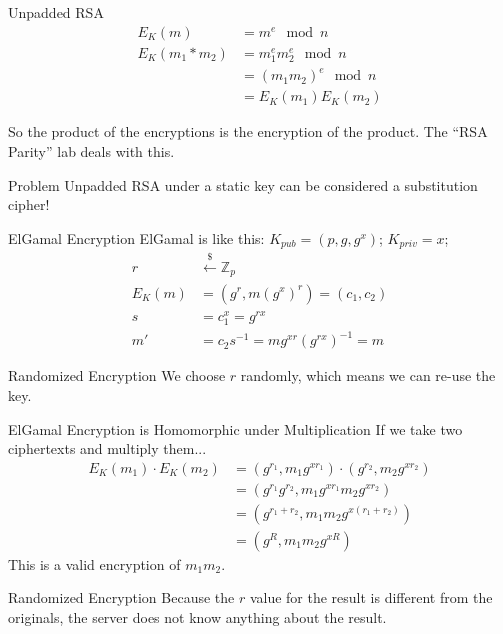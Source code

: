 \documentclass[12pt]{beamer}
\begin{document}
\begin{frame}{Unpadded RSA}
	\begin{align*}
		E_K(m) &= m^e \mod n \\
		E_K(m_1 * m_2) &= m_1^e m_2^e \mod n \\
		&= (m_1m_2)^e \mod n \\
		&= E_K(m_1) E_K(m_2)
	\end{align*}

	\begin{block}{}
		So the product of the encryptions is the encryption of the product. The
		``RSA Parity'' lab deals with this.
	\end{block}

	\begin{alertblock}{Problem}
		Unpadded RSA under a static key can be considered a substitution cipher!
	\end{alertblock}
\end{frame}

\begin{frame}{ElGamal Encryption}
	ElGamal is like this: $K_{pub} = (p, g, g^x)$; $K_{priv} = x$;
	\begin{align*}
		r &\xleftarrow{\$} \mathbb{Z}_p \\
		E_K(m) &= (g^r, m(g^x)^r) = (c_1, c_2) \\
		s &= c_1^x = g^{rx} \\
		m' &= c_2s^{-1} = mg^{xr} (g^{rx})^{-1} = m
	\end{align*}
	
	\begin{block}{Randomized Encryption}
		We choose $r$ randomly, which means we can re-use the key.
	\end{block}
\end{frame}

\begin{frame}{ElGamal Encryption is Homomorphic under Multiplication}
	If we take two ciphertexts and multiply them...
	\begin{align*}
		E_K(m_1) \cdot E_K(m_2) &= (g^{r_1}, m_1g^{xr_1}) \cdot
		(g^{r_2}, m_2g^{xr_2}) \\
		&= (g^{r_1}g^{r_2}, m_1g^{xr_1}m_2g^{xr_2}) \\
		&= (g^{r_1+r_2}, m_1m_2g^{x(r_1 + r_2)}) \\
		&= (g^R, m_1m_2g^{xR})
	\end{align*}
	This is a valid encryption of $m_1m_2$.

	\begin{block}{Randomized Encryption}
		Because the $r$ value for the result is different from the originals,
		the server does not know anything about the result.
	\end{block}
\end{frame}
\end{document}
